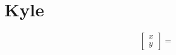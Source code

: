 \documentclass[]{article}
\title{}
\author{}
\begin{document}
\maketitle

\begin{abstract}

\end{abstract}

\section{Kyle}

\[
\begin{bmatrix} x \\ y \end{bmatrix}
=
\]
\end{document}
